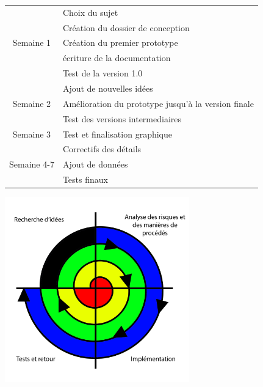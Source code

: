 \documentclass{article}
\begin{document}
\begin{tabular*}{1.0\textwidth}{@{\extracolsep{\fill}} | c | l | }
  \hline
  & Choix du sujet\\
  & Création du dossier de conception\\
  Semaine 1 & Création du premier prototype\\
  & écriture de la documentation\\
  & Test de la version 1.0\hspace*{7.6cm}\\
  \hline
  & Ajout de nouvelles idées\\ 
  Semaine 2  & Amélioration du prototype jusqu'à la version finale\\
  & Test des versions intermediaires\\
  \hline
  Semaine 3  & Test et finalisation graphique\\
  \hline
  & Correctifs des détails\\
  Semaine 4-7 & Ajout de données\\
  & Tests finaux\\
  \hline
\end{tabular*}

\begin{center}
\includegraphics[width=0.6\textwidth]{spiral}\\
\end{center}
\end{document}

